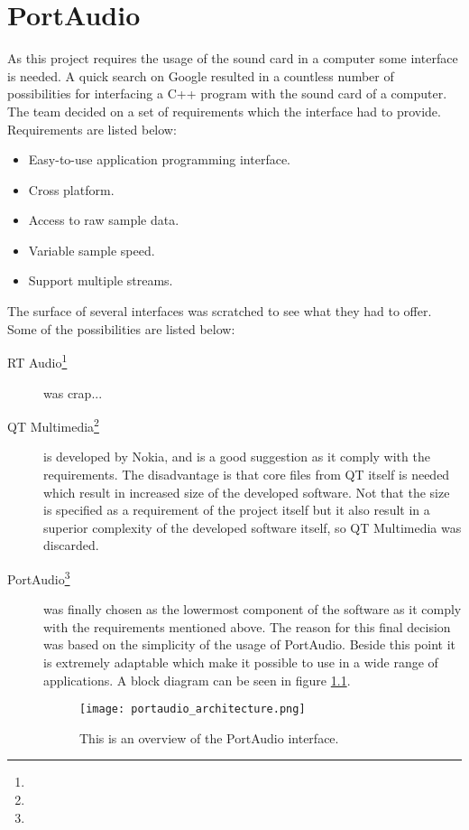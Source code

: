\chapter{PortAudio}\label{chap:lib}\label{app:portaudio}
As this project requires the usage of the sound card in a computer some interface is needed. A quick search on Google resulted in a countless number of possibilities for interfacing a C++ program with the sound card of a computer. The team decided on a set of requirements which the interface had to provide. Requirements are listed below:

\begin{itemize}
\item Easy-to-use application programming interface.
\item Cross platform.
\item Access to raw sample data.
\item Variable sample speed.
\item Support multiple streams.
\end{itemize}

The surface of several interfaces was scratched to see what they had to offer. Some of the possibilities are listed below:

\begin{description}
\item[RT Audio\footnote{}] was crap...

\item[QT Multimedia\footnote{}] is developed by Nokia, and is a good suggestion as it comply with the requirements. The disadvantage is that core files from QT itself is needed which result in increased size of the developed software. Not that the size is specified as a requirement of the project itself but it also result in a superior complexity of the developed software itself, so QT Multimedia was discarded.

\item[PortAudio\footnote{}] was finally chosen as the lowermost component of the software as it comply with the requirements mentioned above.  The reason for this final decision was based on the simplicity of the usage of PortAudio. Beside this point it is extremely adaptable which make it possible to use in a wide range of applications. A block diagram can be seen in figure \ref{fig:app_portaudio}.

\begin{figure}[htb]
	\begin{center}
	\texttt{[image: portaudio\_architecture.png]}%
	\caption{This is an overview of the PortAudio interface.}
	\label{fig:app_portaudio}
	\end{center}
\end{figure}

\end{description}